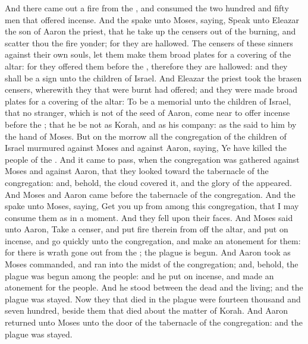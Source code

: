 \begin{biblechapter}
\verse And there came out a fire from the \LORD, and consumed the two hundred and fifty men that offered incense.
\verse And the \LORD spake unto Moses, saying,
\verse Speak unto Eleazar the son of Aaron the priest, that he take up the censers out of the burning, and scatter thou the fire yonder; for they are hallowed.
\verse The censers of these sinners against their own souls, let them make them broad plates for a covering of the altar: for they offered them before the \LORD, therefore they are hallowed: and they shall be a sign unto the children of Israel.
\verse And Eleazar the priest took the brasen censers, wherewith they that were burnt had offered; and they were made broad plates for a covering of the altar:
\verse To be a memorial unto the children of Israel, that no stranger, which is not of the seed of Aaron, come near to offer incense before the \LORD; that he be not as Korah, and as his company: as the \LORD said to him by the hand of Moses.
\verse But on the morrow all the congregation of the children of Israel murmured against Moses and against Aaron, saying, Ye have killed the people of the \LORD.
\verse And it came to pass, when the congregation was gathered against Moses and against Aaron, that they looked toward the tabernacle of the congregation: and, behold, the cloud covered it, and the glory of the \LORD appeared.
\verse And Moses and Aaron came before the tabernacle of the congregation.
\verse And the \LORD spake unto Moses, saying,
\verse Get you up from among this congregation, that I may consume them as in a moment. And they fell upon their faces.
\verse And Moses said unto Aaron, Take a censer, and put fire therein from off the altar, and put on incense, and go quickly unto the congregation, and make an atonement for them: for there is wrath gone out from the \LORD; the plague is begun.
\verse And Aaron took as Moses commanded, and ran into the midst of the congregation; and, behold, the plague was begun among the people: and he put on incense, and made an atonement for the people.
\verse And he stood between the dead and the living; and the plague was stayed.
\verse Now they that died in the plague were fourteen thousand and seven hundred, beside them that died about the matter of Korah.
\verse And Aaron returned unto Moses unto the door of the tabernacle of the congregation: and the plague was stayed.
\end{biblechapter}

